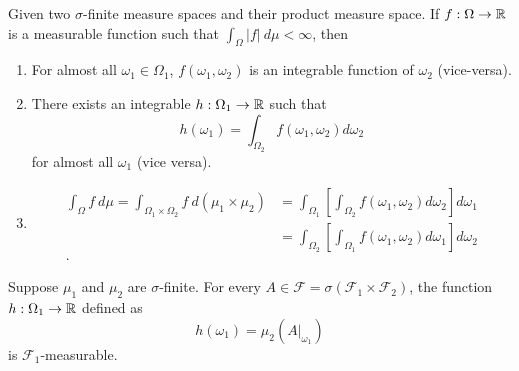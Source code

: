 \documentclass[class=article,crop=false]{standalone}
\begin{document}
\begin{thm}
Given two $\sigma$-finite measure spaces and their product measure space. If $ f: \Omega \to \mathbb{R}$ is a measurable function such that $ \int_{\Omega} |f|\ d \mu < \infty$, then
\begin{enumerate}[label=\arabic*)]
	\item For almost all $ \omega_1 \in \Omega_1$, $ f(\omega_1,\omega_2)$ is an integrable function of $ \omega_2$ (vice-versa).
	\item There exists an integrable $ h:\Omega_1 \to \mathbb{R}$ such that 
		\[
			h(\omega_1) = \int_{\Omega_2} f(\omega_1,\omega_2) d \omega_2
		\]
		for almost all $ \omega_1$ (vice versa).
	\item \begin{align*}
			\int_{\Omega}f\ d \mu = \int_{\Omega_1 \times \Omega_2} f\ d( \mu_1 \times \mu_2) &= \int_{\Omega_1} \left[ \int_{\Omega_2} f(\omega_1,\omega_2) d \omega_2 \right] d \omega_1\\
													  &= \int_{\Omega_2} \left[ \int_{\Omega_1} f(\omega_1, \omega_2) d \omega_1 \right] d\omega_2 \\
		.\end{align*} 
\end{enumerate}
\end{thm}

\begin{lem}[1]
	Suppose $ \mu_1$ and $ \mu_2$ are $\sigma$-finite. For every $ A \in \mathcal{F} = \sigma(\mathcal{F}_1 \times \mathcal{F}_2)$, the function $ h: \Omega_1 \to \mathbb{R}$ defined as 
	\[
		h(\omega_1) = \mu_2(A\big|_{\omega_1})
	\] 
is $ \mathcal{F}_1$-measurable.
\end{lem}
\end{document}
